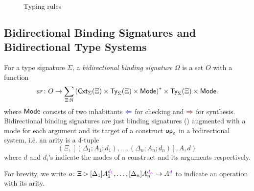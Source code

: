 \begin{figure}
  \centering
  \small
  \caption{Typing rules}
  \label{fig:extrinsic-typing}
\end{figure}

\subsection{Bidirectional Binding Signatures and Bidirectional Type Systems}

\begin{definition}
  For a type signature $\Sigma$, a \emph{bidirectional binding signature} $\Omega$ is a set $O$ with a function
  \[
    \mathit{ar}\colon O \to \sum_{\Xi : \mathbb{N}} \left(\mathsf{Cxt}_{\Sigma}(\Xi) \times \mathsf{Ty}_{\Sigma}(\Xi) \times {\mathsf{Mode}}\right)^* \times \mathsf{Ty}_{\Sigma}(\Xi) \times {\mathsf{Mode}}.
  \]
  where $\mathsf{Mode}$ consists of two inhabitants $\chk$ for checking and $\syn$ for synthesis.
  Bidirectional binding signatures are just binding signatures () augmented with a mode for each argument and its target of a construct $\mathsf{op}_o$ in a bidirectional system, i.e.
  an arity is a $4$-tuple
  \[
    \left(\Xi, \left[\left(\Delta_1; A_1; d_1\right), \ldots, \left(\Delta_{n}; A_{n}; d_n\right) \right], A, d\right)
  \]
  where $d$ and $d_i$'s indicate the modes of a construct and its arguments respectively.

  For brevity, we write $o \colon \Xi \rhd [\Delta_1]A_{1}^{\dir{d_1}}, \ldots, [\Delta_{n}] A^{\dir{d_n}}_{n} \to A^{\dir{d}}$ to indicate an operation with its arity. 
\end{definition}

